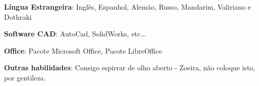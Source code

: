 \begin{cventries}

\cventry{}{}{}{}
    {\begin{cvitems}
    \vspace{-0.5 cm}
        \item \textbf{Língua Estrangeira}: Inglês, Espanhol, Alemão, Russo, Mandarim, Valiriano e Dothraki
        \item \textbf{Software CAD}: AutoCad, SolidWorks, etc...
        \item \textbf{Office}: Pacote Microsoft Office, Pacote LibreOffice
        \item \textbf{Outras habilidades}: Consigo espirrar de olho aberto - Zoeira, não coloque isto, por gentileza.
      \end{cvitems}
      }


 
\end{cventries}
